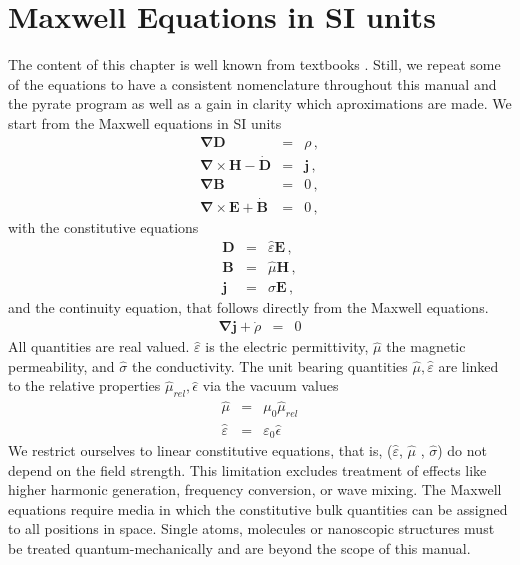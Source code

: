 \documentclass[12pt,a4paper,twoside,openright,BCOR10mm,headsepline,titlepage,abstracton,chapterprefix,final]{scrreprt}
\newcommand\Vector[1]{{\mathbf{#1}}}
\newcommand\vacuum{0}
\newcommand\Nabla{\Vector{\nabla}}
\newcommand\timederivative[1]{\dot{{#1}}}
\newcommand\Tensor[1]{\hat{#1}}
\newcommand\scalarEfield{E}
\newcommand\scalarBfield{B}
\newcommand\scalarHfield{H}
\newcommand\scalarDfield{D}
\newcommand\Efield{\Vector{\scalarEfield}}
\newcommand\Bfield{\Vector{\scalarBfield}}
\newcommand\Hfield{\Vector{\scalarHfield}}
\newcommand\Dfield{\Vector{\scalarDfield}}
\newcommand\permeability{\Tensor{\scalarpermeability}}
\newcommand\vacuumpermeability{\scalarpermeability_{\vacuum}}
\newcommand\scalarpermeability{\mu}
\newcommand\relativepermeability{\Tensor{\mu}_{rel}}
\newcommand\permittivity{\Tensor{\scalarpermittivity}}
\newcommand\vacuumpermittivity{\scalarpermittivity_{\vacuum}}
\newcommand\scalarrelativepermittivity{\epsilon}
\newcommand\relativepermittivity{\Tensor{\scalarrelativepermittivity}}
\newcommand\scalarpermittivity{\varepsilon}
\newcommand\conductivity{\Tensor{\sigma}}
\newcommand\currentdensity{\Vector{j}}
\newcommand\chargedensity{\rho}
\begin{document}
\section{Maxwell Equations in SI units}
The content of this chapter is well known from textbooks \cite{Jackson, BornWolf}. Still, we repeat some of the equations to have a consistent 
nomenclature throughout this manual and the pyrate program as well as a gain in clarity which aproximations are made.
We start from the Maxwell equations in SI units
\begin{subequations}\label{eq:Maxwell}
\begin{eqnarray}
  \Nabla \Dfield &=& \chargedensity\,, 							\label{eq:MaxwellNablaD}\\
  \Nabla \times \Hfield -\timederivative{\Dfield} &=&  \currentdensity\,,  		\label{eq:MaxwellNablaCrossH} \\
  \Nabla \Bfield &=& 0\,,  									\label{eq:MaxwellNablaB} \\
  \Nabla \times \Efield + \timederivative{\Bfield} &=& 0\,,   					\label{eq:MaxwellNablaCrossE}
\end{eqnarray}
\end{subequations}
with the constitutive equations
\begin{subequations}\label{eq:Material}
\begin{eqnarray}
  \Dfield &=& \permittivity \Efield\,, 								\label{eq:ConstitutiveEpsilon}\\
  \Bfield &=& \permeability \Hfield\,, 								\label{eq:ConstitutiveMu}\\
  \currentdensity &=& \conductivity \Efield\,,						\label{eq:ConstitutiveSigma}
\end{eqnarray}
\end{subequations}
and the continuity equation, that follows directly from the Maxwell equations.
\begin{eqnarray}
  \Nabla \currentdensity + \timederivative{\chargedensity} &=& 0		\label{eq:continuity}
\end{eqnarray}
All quantities are real valued. $\permittivity$ is the  electric  permittivity, 
$\permeability$ the magnetic permeability, 
and $\conductivity$ the conductivity.
The unit bearing quantities $\permeability, \permittivity$ 
are linked to the relative properties $\relativepermeability, \relativepermittivity$ via
the vacuum values
\begin{eqnarray}
 \permeability &=& \vacuumpermeability \relativepermeability \\
 \permittivity &=& \vacuumpermittivity \relativepermittivity
\end{eqnarray}
We restrict ourselves to linear constitutive equations, that is, ($\permittivity$, $\permeability$ , $\conductivity$) do not depend on the field strength.
This limitation excludes treatment of effects like higher harmonic generation, frequency conversion, or wave mixing.
The Maxwell equations require media in which the constitutive bulk quantities can be assigned to all positions in space.
Single atoms, molecules or nanoscopic structures must be treated quantum-mechanically and are beyond the scope of this manual.
\end{document}
